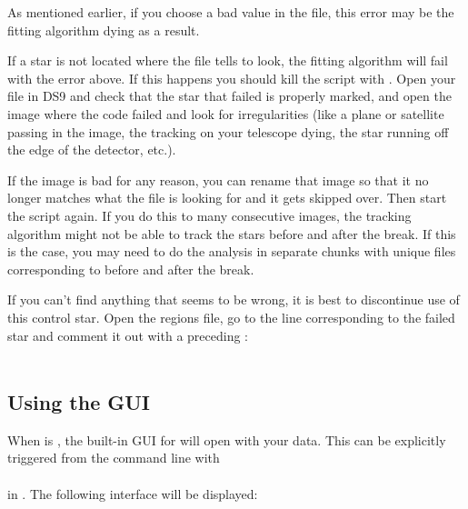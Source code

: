 \documentclass{article}
\begin{document}
\noindent As mentioned earlier, if you choose a bad  value in the  file, this error may be the fitting algorithm dying as a result. 

	If a star is not located where the  file tells \oscaar  to look, the fitting algorithm will fail with the error above. If this happens you should kill the script with . Open your  file in DS9 and check that the star that failed is properly marked, and open the image where the code failed and look for irregularities (like a plane or satellite passing in the image, the tracking on your telescope dying, the star running off the edge of the detector, etc.).

If the image is bad for any reason, you can rename that image so that it no longer matches what the  file is looking for and it gets skipped over. Then start the script again. If you do this to many consecutive images, the tracking algorithm might not be able to track the stars before and after the break. If this is the case, you may need to do the \oscaar  analysis in separate chunks with unique  files corresponding to before and after the break. 

If you can't find anything that seems to be wrong, it is best to discontinue use of this control star. Open the regions file, go to the  line corresponding to the failed star and comment it out with a preceding \code{\#}: \\

\indent {}\\

\subsection{Using the \oscaar  GUI} 
\label{sec:gui}

When  is , the built-in GUI for \oscaar  will open with your data. This can be explicitly triggered from the command line with \\

\indent {}\\

\noindent in . The following interface will be displayed:\\
\end{document}
